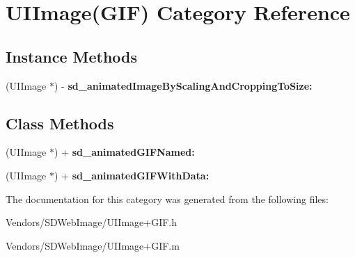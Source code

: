 \hypertarget{category_u_i_image_07_g_i_f_08}{}\section{U\+I\+Image(G\+I\+F) Category Reference}
\label{category_u_i_image_07_g_i_f_08}
\subsection*{Instance Methods}
\begin{DoxyCompactItemize}
\item 
\hypertarget{category_u_i_image_07_g_i_f_08_a43192acee9cdd044e0a0d90214cf6597}{}(U\+I\+Image $\ast$) -\/ {\bfseries sd\+\_\+animated\+Image\+By\+Scaling\+And\+Cropping\+To\+Size\+:}\label{category_u_i_image_07_g_i_f_08_a43192acee9cdd044e0a0d90214cf6597}

\end{DoxyCompactItemize}
\subsection*{Class Methods}
\begin{DoxyCompactItemize}
\item 
\hypertarget{category_u_i_image_07_g_i_f_08_a11a7284b0069e0f2002f89c16cfbd448}{}(U\+I\+Image $\ast$) + {\bfseries sd\+\_\+animated\+G\+I\+F\+Named\+:}\label{category_u_i_image_07_g_i_f_08_a11a7284b0069e0f2002f89c16cfbd448}

\item 
\hypertarget{category_u_i_image_07_g_i_f_08_a8fc0cea75b8b1b1504bf2a173081dea2}{}(U\+I\+Image $\ast$) + {\bfseries sd\+\_\+animated\+G\+I\+F\+With\+Data\+:}\label{category_u_i_image_07_g_i_f_08_a8fc0cea75b8b1b1504bf2a173081dea2}

\end{DoxyCompactItemize}


The documentation for this category was generated from the following files\+:\begin{DoxyCompactItemize}
\item 
Vendors/\+S\+D\+Web\+Image/U\+I\+Image+\+G\+I\+F.\+h\item 
Vendors/\+S\+D\+Web\+Image/U\+I\+Image+\+G\+I\+F.\+m\end{DoxyCompactItemize}
